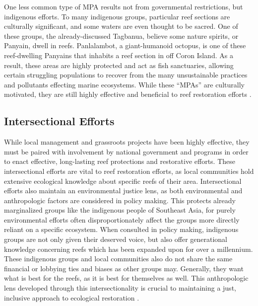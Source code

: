 \documentclass{book}\usepackage{knitr}
\begin{document}
\begin{knitrout}
\begin{kframe}
One less common type of MPA results not from governmental restrictions, but indigenous efforts. To many indigenous groups, particular reef sections are culturally significant, and some waters are even thought to be sacred. One of these groups, the already-discussed Tagbanua, believe some nature spirits, or Panyain, dwell in reefs. Panlalambot, a giant-humanoid octopus, is one of these reef-dwelling Panyains that inhabits a reef section in off Coron Island. As a result, these areas are highly protected and act as fish sanctuaries, allowing certain struggling populations to recover from the many unsustainable practices and pollutants effecting marine ecosystems. While these ``MPAs'' are culturally motivated, they are still highly effective and beneficial to reef restoration efforts \citep{4826000120100501}.

\subsection{Intersectional Efforts} \label{sub:ie}

While local management and grassroots projects have been highly effective, they must be paired with involvement by national government and programs in order to enact effective, long-lasting reef protections and restorative efforts. These intersectional efforts are vital to reef restoration efforts, as local communities hold extensive ecological knowledge about specific reefs of their area. Intersectional efforts also maintain an environmental justice lens, as both environmental and anthropologic factors are considered in policy making. This protects already marginalized groups like the indigenous people of Southeast Asia, for purely environmental efforts often disproportionately affect the groups more directly reliant on a specific ecosystem. When consulted in policy making, indigenous groups are not only given their deserved voice, but also offer generational knowledge concerning reefs which has been expanded upon for over a millennium. These indigenous groups and local communities also do not share the same financial or lobbying ties and biases as other groups may. Generally, they want what is best for the reefs, as it is best for themselves as well. This anthropologic lens developed through this intersectionality is crucial to maintaining a just, inclusive approach to ecological restoration \citep{13772149520190801}.


\end{kframe}
\end{knitrout}
\end{document}
